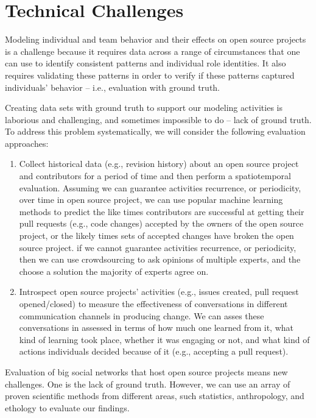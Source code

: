 \section{Technical Challenges}
\label{sec:challenges}
Modeling individual and team behavior and their effects on open source projects
is a challenge because it requires data across a range of circumstances that one
can use to identify consistent patterns and individual role identities. It also
requires validating these patterns in order to verify if these patterns captured individuals' behavior -- i.e., evaluation with ground truth.

Creating data sets with ground truth to support our modeling activities is laborious and challenging, and sometimes impossible to do -- lack of ground truth. To address this problem systematically, we will consider the following evaluation approaches:

\begin{enumerate}
  \item Collect historical data (e.g., revision history) about an open source project and contributors for a period of time and then perform a spatiotemporal evaluation. Assuming we can guarantee activities recurrence, or periodicity, over time in open source project, we can use popular machine learning methods to predict the like times contributors are successful at getting their pull requests (e.g., code changes) accepted by the owners of the open source project, or the likely times sets of accepted changes have broken the open source project. if we cannot guarantee activities recurrence, or periodicity, then we can use crowdsourcing to ask opinions of multiple experts, and the choose a solution the majority of experts agree on.
  \item Introspect open source projects' activities (e.g., issues created, pull request opened/closed) to measure the effectiveness of conversations in different communication channels in producing change. We can asses these conversations in assessed in terms of how much one learned from it, what kind of learning took place, whether it was engaging or not, and what kind of actions individuals decided because of it (e.g., accepting a pull request).
\end{enumerate}

Evaluation of big social networks that host open source projects means new challenges. One is the lack of ground truth. However, we can use an array of proven scientific methods from different areas, such statistics, anthropology, and ethology to evaluate our findings.
